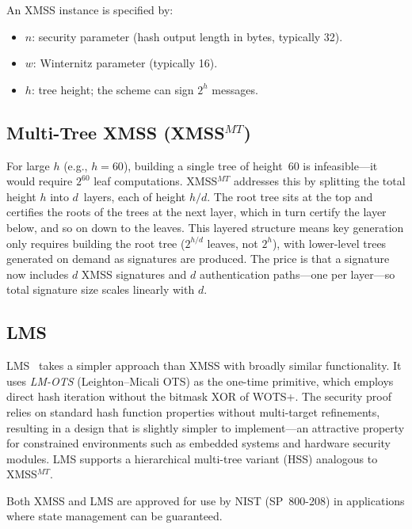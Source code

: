 \begin{definition}
\label{def:xmss-params}
An XMSS instance is specified by:
\begin{itemize}
\item $n$: security parameter (hash output length in bytes, typically 32).
\item $w$: Winternitz parameter (typically 16).
\item $h$: tree height; the scheme can sign $2^h$ messages.
\end{itemize}
\end{definition}

\subsection{Multi-Tree XMSS (\texorpdfstring{XMSS$^{MT}$}{XMSS-MT})}
\label{subsec:xmss-mt}

For large $h$ (e.g., $h = 60$), building a single tree of height~60 is infeasible---it would require $2^{60}$ leaf computations.  XMSS$^{MT}$ addresses this by splitting the total height $h$ into $d$~layers, each of height $h/d$.  The root tree sits at the top and certifies the roots of the trees at the next layer, which in turn certify the layer below, and so on down to the leaves.  This layered structure means key generation only requires building the root tree ($2^{h/d}$ leaves, not $2^h$), with lower-level trees generated on demand as signatures are produced.  The price is that a signature now includes $d$ XMSS signatures and $d$ authentication paths---one per layer---so total signature size scales linearly with $d$.

\subsection{LMS}
\label{subsec:lms}

LMS~\cite{RFC8554} takes a simpler approach than XMSS with broadly similar functionality.  It uses \emph{LM-OTS} (Leighton--Micali OTS) as the one-time primitive, which employs direct hash iteration without the bitmask XOR of WOTS+.  The security proof relies on standard hash function properties without multi-target refinements, resulting in a design that is slightly simpler to implement---an attractive property for constrained environments such as embedded systems and hardware security modules.  LMS supports a hierarchical multi-tree variant (HSS) analogous to XMSS$^{MT}$.

Both XMSS and LMS are approved for use by NIST (SP~800-208) in applications where state management can be guaranteed.

